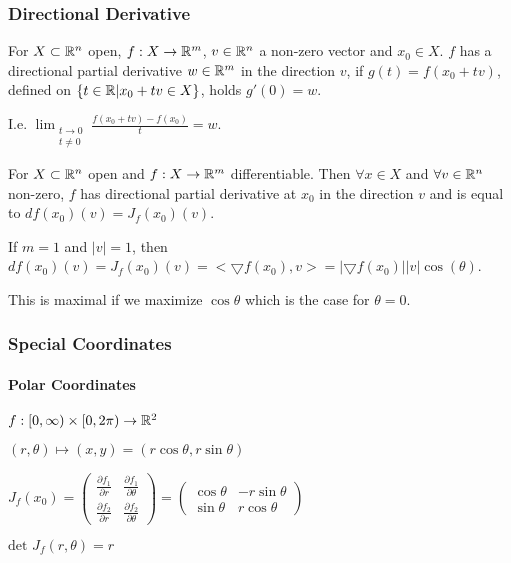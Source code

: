 \subsubsection{Directional Derivative}
For $X \subset \mathbb{R}^n$ open, $f: X \to \mathbb{R}^m$, $v \in \mathbb{R}^n$ a non-zero vector and $x_0 \in X$. $f$ has a directional partial derivative $w \in \mathbb{R}^m$ in the direction $v$, if $g(t) = f(x_0 + tv)$, defined on $\{t \in \mathbb{R} | x_0 + tv \in X\}$, holds $g'(0) = w$.

\begin{compactitem}
    \item I.e. $\lim_{\substack{t \to 0\\ t \neq 0}} \frac{f(x_0 + tv) - f(x_0)}{t} = w$.
\end{compactitem}

For $X \subset \mathbb{R}^n$ open and $f: X \to \mathbb{R}^m$ differentiable. Then $\forall x \in X$ and $\forall v \in \mathbb{R}^n$ non-zero, $f$ has directional partial derivative at $x_0$ in the direction $v$ and is equal to $df(x_0) (v) = J_f(x_0)(v)$.

\begin{compactitem}
\item If $m = 1$ and $|v| = 1$, then $df(x_0) (v) = J_f(x_0)(v) = <\bigtriangledown f(x_0), v> = |\bigtriangledown f(x_0)||v|\cos(\theta)$.
    \begin{compactitem}
        \item This is maximal if we maximize $\cos \theta$ which is the case for $\theta = 0$.
    \end{compactitem}
\end{compactitem}


\subsubsection{Special Coordinates}
\paragraph{Polar Coordinates}
\begin{inparaitem}
    \item $f: [0, \infty) \times [0, 2\pi) \to \mathbb{R}^2$
    \item $(r, \theta) \mapsto (x, y) = (r \cos \theta, r \sin \theta)$
    \item $J_f(x_0) = 
        \begin{pmatrix}
            \frac{\partial f_1}{\partial r} & \frac{\partial f_1}{\partial \theta}\\
            \frac{\partial f_2}{\partial r} & \frac{\partial f_2}{\partial \theta}
        \end{pmatrix} = 
        \begin{pmatrix}
            \cos \theta & -r \sin \theta\\
            \sin \theta & r \cos \theta
        \end{pmatrix}$
    \item $\text{det }J_f(r, \theta) = r$
\end{inparaitem}

